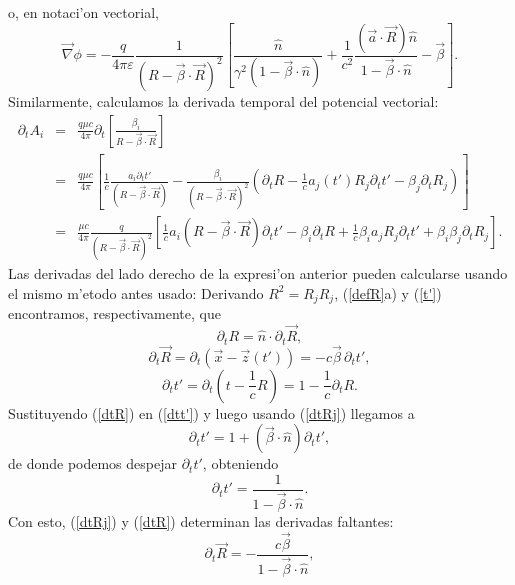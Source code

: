 o, en notaci'on vectorial,
\begin{equation}
 \vec\nabla\phi=-\frac{q}{4\pi\varepsilon}\frac{1}{(R-\vec{\beta}\cdot\vec{R})^2}\left[\frac{\hat{n}}{\gamma^2(1-\vec{\beta}\cdot\hat{n})}+\frac{1}{c^2}\frac{(\vec{a}\cdot\vec{R})\hat{n}}{1-\vec{\beta}\cdot\hat{n}}-\vec\beta\right].
\end{equation}
Similarmente, calculamos la derivada temporal del potencial vectorial:
\begin{eqnarray}
 \partial_t A_i&=&\frac{q\mu c}{4\pi}\partial_t\left[\frac{\beta_i}{R-\vec{\beta}\cdot\vec{R}}\right] \\
&=&\frac{q\mu c}{4\pi}\left[\frac{1}{c}\frac{a_i\partial_tt'}{(R-\vec{\beta}\cdot\vec{R})}-\frac{\beta_i}{(R-\vec{\beta}\cdot\vec{R})^2}\left(\partial_tR-\frac{1}{c}a_j(t')R_j\partial_t t'-\beta_j\partial_tR_j\right)\right] \\
&=&\frac{\mu c}{4\pi}\frac{q}{(R-\vec{\beta}\cdot\vec{R})^2}\left[\frac{1}{c}a_i(R-\vec{\beta}\cdot\vec{R})\partial_tt'-\beta_i\partial_tR+\frac{1}{c}\beta_ia_jR_j\partial_t t'+\beta_i\beta_j\partial_tR_j\right] . \label{dtA}
\end{eqnarray}
Las derivadas del lado derecho de la expresi'on anterior pueden calcularse usando el mismo m'etodo antes usado: Derivando $R^2=R_jR_j$, (\ref{defR}a) y (\ref{t'}) encontramos, respectivamente, que
\begin{equation}
\partial_t R=\hat{n}\cdot\partial_t \vec{R}, \label{dtR}
\end{equation}
\begin{equation}
 \partial_t \vec{R}=\partial_t( \vec{x}-\vec{z}(t'))=-c\vec{\beta}\,\partial_t t', \label{dtRj}
\end{equation}
\begin{equation}
 \partial_t t'=\partial_t(t-\frac{1}{c}R)=1-\frac{1}{c}\partial_tR. \label{dtt'}
\end{equation}
Sustituyendo (\ref{dtR}) en (\ref{dtt'})  y luego usando (\ref{dtRj}) llegamos a
\begin{equation}
 \partial_t t'=1+(\vec{\beta}\cdot\hat{n})\partial_tt',
\end{equation}
de donde podemos despejar $\partial_t t'$, obteniendo
\begin{equation}
 \boxed{\partial_t t'=\frac{1}{1-\vec{\beta}\cdot\hat{n}}.} \label{dtt'2}
\end{equation}
Con esto, (\ref{dtRj}) y (\ref{dtR}) determinan las derivadas faltantes:
\begin{equation}
 \boxed{\partial_t \vec{R}=-\frac{c\vec\beta}{1-\vec{\beta}\cdot\hat{n}},}
\end{equation}
